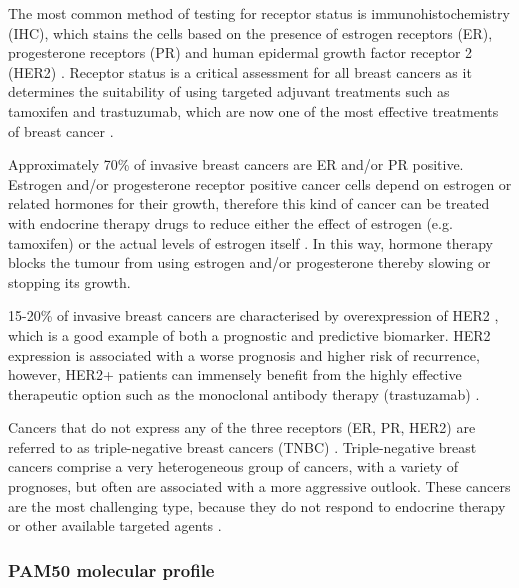     The most common method of testing for receptor status is immunohistochemistry (IHC), which stains the cells based on the presence of estrogen receptors (ER), progesterone receptors (PR) and  human epidermal growth factor receptor 2 (HER2) \cite{Zaha2014}. Receptor status is a critical assessment for all breast cancers as it determines the suitability of using targeted adjuvant treatments such as tamoxifen and trastuzumab, which are now one of the most effective treatments of breast cancer \cite{stickeler2011prognostic}. 

    Approximately 70\% of invasive breast cancers are ER and/or PR positive. Estrogen and/or progesterone receptor positive cancer cells depend on estrogen or related hormones for their growth, therefore this kind of cancer can be treated with endocrine therapy drugs to reduce either the effect of estrogen (e.g. tamoxifen) or the actual levels of estrogen itself \cite{early2005effects}. In this way, hormone therapy blocks the tumour from using estrogen and/or progesterone thereby slowing or stopping its growth. 

    15-20\% of invasive breast cancers are characterised by overexpression of HER2  \cite{stickeler2011prognostic}, which is a good example of both a prognostic and predictive biomarker. HER2 expression is associated with a worse prognosis and higher risk of recurrence, however, HER2+ patients can immensely benefit from the highly effective therapeutic option such as the monoclonal antibody therapy (trastuzamab) \cite{iqbal2014human}. 

    Cancers that do not express any of the three receptors (ER, PR, HER2) are referred to as triple-negative breast cancers (TNBC) \cite{foulkes2010triple}. Triple-negative breast cancers comprise a very heterogeneous group of cancers, with a variety of prognoses, but often are associated with a more aggressive outlook. These cancers are the most challenging type, because they do not respond to endocrine therapy or other available targeted agents \cite{hudis2011triple}. 

    
    
    
    
    
    
    
            
 
            
    \subsubsection{PAM50 molecular profile}
    

